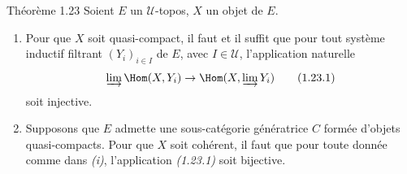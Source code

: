 \begin{enonce*}{Théorème 1.23}
Soient $E$ un $𝒰$-topos, $X$ un objet de $E$.
\begin{enumerate}
\renewcommand{\theenumi}{\roman{enumi}}
\renewcommand{\labelenumi}{(\theenumi)}
\item Pour que $X$ soit quasi-compact, il faut et il suffit que pour
  tout système inductif filtrant $(Y_i)_{i \in I}$ de $E$, avec $I \in
  𝒰$, l'application naturelle
\begin{equation*}
\varinjlim  \Hom(X, Y_i) \to \Hom(X, \varinjlim Y_i)\tag{1.23.1}
\end{equation*}
soit injective.

\item Supposons que $E$ admette une sous-catégorie génératrice $C$
  formée d'objets quasi-compacts. Pour que $X$ soit cohérent, il faut
  que pour toute donnée comme dans \emph{(i)}, l'application
  \emph{(1.23.1)} soit bijective.
\end{enumerate}
\end{enonce*}

